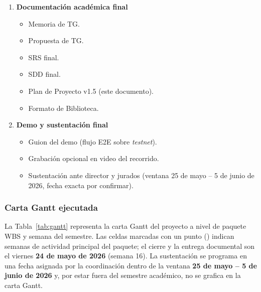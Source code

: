 \documentclass[12pt,oneside]{report}
\begin{document}
\begin{enumerate}[label=\textbf{1.\arabic*},leftmargin=*]
\begin{itemize}[label=$\circ$]
            \item Variables de entorno y secretos.
          \end{itemize}
        \item \textbf{Documentación académica final}
          \begin{itemize}[label=$\circ$]
            \item Memoria de TG.
            \item Propuesta de TG.
            \item SRS final.
            \item SDD final.
            \item Plan de Proyecto v1.5 (este documento).
            \item Formato de Biblioteca.
          \end{itemize}
        \item \textbf{Demo y sustentación final}
          \begin{itemize}[label=$\circ$]
            \item Guion del demo (flujo E2E sobre \textit{testnet}).
            \item Grabación opcional en video del recorrido.
            \item Sustentación ante director y jurados (ventana 25 de mayo -- 5 de junio de 2026, fecha exacta por confirmar).
          \end{itemize}
      \end{enumerate}

      \subsubsection{Carta Gantt ejecutada}
      \label{subsubsec:gantt}
      La Tabla~\ref{tab:gantt} representa la carta Gantt del proyecto a nivel de paquete WBS y semana del semestre. Las celdas marcadas con un punto (\textbullet) indican semanas de actividad principal del paquete; el cierre y la entrega documental son el viernes \textbf{24 de mayo de 2026} (semana 16). La sustentación se programa en una fecha asignada por la coordinación dentro de la ventana \textbf{25 de mayo -- 5 de junio de 2026} y, por estar fuera del semestre académico, no se grafica en la carta Gantt.
\end{document}

